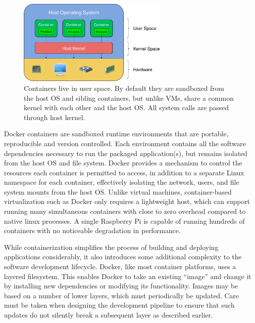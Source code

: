 \documentclass[12pt,initial,twoside,maitrise]{dms}
\numberwithin{equation}{section}
\numberwithin{table}{chapter}
\numberwithin{figure}{chapter}
\begin{document}
\begin{figure}[ht]
    \centering
    \includegraphics[width=0.65\textwidth]{user_kernel_hardware.png}
    \caption{Containers live in user space. By default they are sandboxed from the host OS and sibling containers, but unlike VMs, share a common kernel with each other and the host OS. All system calls are passed through host kernel.}
    \label{fig:user_kernel_hardware}
\end{figure}

Docker containers are sandboxed runtime environments that are portable, reproducible and version controlled. Each environment contains all the software dependencies necessary to run the packaged application(s), but remains isolated from the host OS and file system. Docker provides a mechanism to control the resources each container is permitted to access, in addition to a separate Linux namespace for each container, effectively isolating the network, users, and file system mounts from the host OS. Unlike virtual machines, container-based virtualization such as Docker only requires a lightweight host, which can support running many simultaneous containers with close to zero overhead compared to native linux processes. A single Raspberry Pi is capable of running hundreds of containers with no noticeable degradation in performance.

While containerization simplifies the process of building and deploying applications considerably, it also introduces some additional complexity to the software development lifecycle. Docker, like most container platforms, uses a layered filesystem. This enables Docker to take an existing ``image'' and change it by installing new dependencies or modifying its functionality. Images may be based on a number of lower layers, which must periodically be updated. Care must be taken when designing the development pipeline to ensure that such updates do not silently break a subsequent layer as described earlier.
\end{document}
